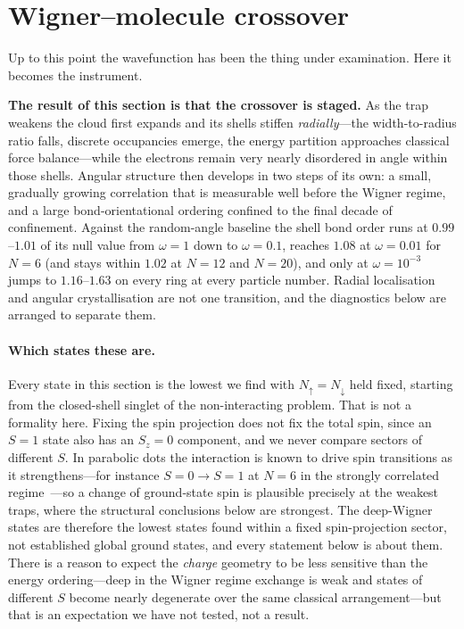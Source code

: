 \section{Wigner--molecule crossover}
\label{sec:wigner-molecule}

Up to this point the wavefunction has been the thing under examination. Here it becomes
the instrument.

\textbf{The result of this section is that the crossover is staged.} As the trap weakens the
cloud first expands and its shells stiffen \emph{radially}---the width-to-radius ratio
falls, discrete occupancies emerge, the energy partition approaches classical force
balance---while the electrons remain very nearly disordered in angle within those shells.
Angular structure then develops in two steps of its own: a small, gradually growing
correlation that is measurable well before the Wigner regime, and a large
bond-orientational ordering confined to the final decade of confinement. Against the
random-angle baseline the shell bond order runs at $0.99$--$1.01$ of its null value from
$\omega=1$ down to $\omega=0.1$, reaches $1.08$ at $\omega=0.01$ for $N{=}6$ (and stays
within $1.02$ at $N{=}12$ and $N{=}20$), and only at $\omega=10^{-3}$ jumps to $1.16$--$1.63$
on every ring at every particle number. Radial localisation and angular crystallisation are
not one transition, and the diagnostics below are arranged to separate them.

\paragraph{Which states these are.}
Every state in this section is the lowest we find with $N_\uparrow=N_\downarrow$ held fixed,
starting from the closed-shell singlet of the non-interacting problem. That is not a
formality here. Fixing the spin projection does not fix the total spin, since an $S=1$ state
also has an $S_z=0$ component, and we never compare sectors of different $S$. In parabolic
dots the interaction is known to drive spin transitions as it strengthens---for instance
$S=0\!\to\!S=1$ at $N=6$ in the strongly correlated regime~\cite{Egger_1999}---so a change
of ground-state spin is plausible precisely at the weakest traps, where the structural
conclusions below are strongest. The deep-Wigner states are therefore the lowest states
found within a fixed spin-projection sector, not established global ground states, and
every statement below is about them. There is a reason to expect the \emph{charge}
geometry to be less sensitive than the energy ordering---deep in the Wigner regime exchange
is weak and states of different $S$ become nearly degenerate over the same classical
arrangement---but that is an expectation we have not tested, not a result.

